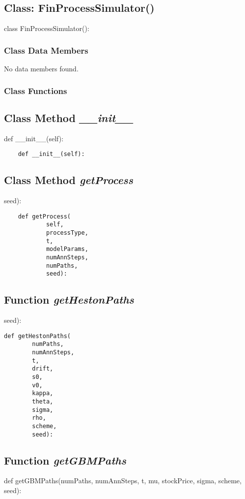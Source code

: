\documentclass[twoside,11pt]{book}
\begin{document}
\subsection{Class: FinProcessSimulator()}
class FinProcessSimulator():

\subsubsection{Class Data Members}
No data members found.

\subsubsection{Class Functions}

\subsection{Class Method {\it \_\_init\_\_}}
def \_\_init\_\_(self):

\begin{lstlisting}
    def __init__(self):
\end{lstlisting}

\subsection{Class Method {\it getProcess}}
seed):

\begin{lstlisting}
    def getProcess(
            self,
            processType,
            t,
            modelParams,
            numAnnSteps,
            numPaths,
            seed):
\end{lstlisting}

\subsection{Function {\it getHestonPaths}}
seed):

\begin{lstlisting}
def getHestonPaths(
        numPaths,
        numAnnSteps,
        t,
        drift,
        s0,
        v0,
        kappa,
        theta,
        sigma,
        rho,
        scheme,
        seed):
\end{lstlisting}

\subsection{Function {\it getGBMPaths}}
def getGBMPaths(numPaths, numAnnSteps, t, mu, stockPrice, sigma, scheme, seed):
\end{document}
